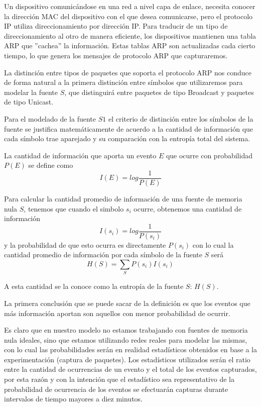 \documentclass[letterpaper, 10 pt, conference]{ieeeconf}  %
\begin{document}
Un dispositivo comunicándose en una red a nivel capa de enlace, necesita conocer la dirección MAC del dispositivo con el que desea comunicarse, pero el protocolo IP utiliza direccionamiento por dirección IP. Para traducir de un tipo de direccionamiento al otro de manera eficiente, los dispositivos mantienen una tabla ARP que ''cachea'' la información. Estas tablas ARP son actualizadas cada cierto tiempo, lo que genera los mensajes de protocolo ARP que capturaremos.

La distinción entre tipos de paquetes que soporta el protocolo ARP nos conduce de forma natural a la primera distinción entre símbolos que utilizaremos para modelar la fuente $S$, que distinguirá entre paquetes de tipo Broadcast y paquetes de tipo Unicast.


Para el modelado de la fuente $S1$ el criterio de distinción entre los símbolos de la fuente se justifica  matemáticamente de acuerdo a la cantidad de información que cada símbolo trae aparejado y su comparación con la entropía total del sistema.

La cantidad de información que aporta un evento $E$ que ocurre con probabilidad $P(E)$ se define como 
\[I(E) = log \frac{1}{P(E)}\]

Para calcular la cantidad promedio de información de una fuente de memoria nula $S$, tenemos que cuando el simbolo $s_i$ ocurre, obtenemos una cantidad de información 
\[I(s_i) = log \frac{1}{P(s_i)}\]
y la probabilidad de que esto ocurra es directamente $P(s_i)$ con lo cual la cantidad promedio de información por cada símbolo de la fuente $S$ será
\[H(S) = \sum_{S} P(s_i) I(s_i)\]

A esta cantidad se la conoce como la entropía de la fuente $S$: $H(S)$.

La primera conclusión que se puede sacar de la definición es que los eventos que más información aportan son aquellos con menor probabilidad de ocurrir.

Es claro que en nuestro modelo no estamos trabajando con fuentes de memoria nula ideales, sino que estamos utilizando redes reales para modelar las mismas, con lo cual las probabilidades serán en realidad estadísticos obtenidos en base a la experimentación (captura de paquetes). Los estadísticos utilizados serán el ratio entre la cantidad de ocurrencias de un evento y el total de los eventos capturados, por esta razón y con la intención que el estadístico sea representativo de la probabilidad de ocurrencia de los eventos se efectuarán capturas durante intervalos de tiempo mayores a diez minutos.
\end{document}
